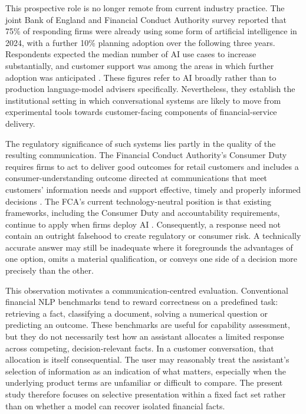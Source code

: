 \documentclass[12pt,a4paper,oneside]{report}
\begin{document}
This prospective role is no longer remote from current industry practice. The joint Bank of England and Financial Conduct Authority survey reported that 75\% of responding firms were already using some form of artificial intelligence in 2024, with a further 10\% planning adoption over the following three years. Respondents expected the median number of AI use cases to increase substantially, and customer support was among the areas in which further adoption was anticipated \parencite{boe_fca_2024_ai}. These figures refer to AI broadly rather than to production language-model advisers specifically. Nevertheless, they establish the institutional setting in which conversational systems are likely to move from experimental tools towards customer-facing components of financial-service delivery.

The regulatory significance of such systems lies partly in the quality of the resulting communication. The Financial Conduct Authority's Consumer Duty requires firms to act to deliver good outcomes for retail customers and includes a consumer-understanding outcome directed at communications that meet customers' information needs and support effective, timely and properly informed decisions \parencite{fca_2022_consumer_duty}. The FCA's current technology-neutral position is that existing frameworks, including the Consumer Duty and accountability requirements, continue to apply when firms deploy AI \parencite{fca_2026_ai_approach}. Consequently, a response need not contain an outright falsehood to create regulatory or consumer risk. A technically accurate answer may still be inadequate where it foregrounds the advantages of one option, omits a material qualification, or conveys one side of a decision more precisely than the other.

This observation motivates a communication-centred evaluation. Conventional financial NLP benchmarks tend to reward correctness on a predefined task: retrieving a fact, classifying a document, solving a numerical question or predicting an outcome. These benchmarks are useful for capability assessment, but they do not necessarily test how an assistant allocates a limited response across competing, decision-relevant facts. In a customer conversation, that allocation is itself consequential. The user may reasonably treat the assistant's selection of information as an indication of what matters, especially when the underlying product terms are unfamiliar or difficult to compare. The present study therefore focuses on selective presentation within a fixed fact set rather than on whether a model can recover isolated financial facts.
\end{document}
